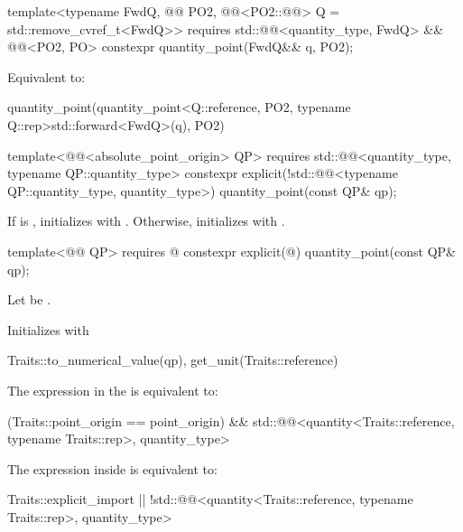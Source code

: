 \begin{itemdecl}
template<typename FwdQ, @@ PO2,
         @@<PO2::@@> Q = std::remove_cvref_t<FwdQ>>
  requires std::@@<quantity_type, FwdQ> && @@<PO2, PO>
constexpr quantity_point(FwdQ&& q, PO2);
\end{itemdecl}

\begin{itemdescr}
\pnum
\effects
Equivalent to:
\begin{codeblock}
quantity_point(quantity_point<Q::reference, PO2{}, typename Q::rep>{std::forward<FwdQ>(q),
                                                                    PO2{}})
\end{codeblock}
\end{itemdescr}

\begin{itemdecl}
template<@@<absolute_point_origin> QP>
  requires std::@@<quantity_type, typename QP::quantity_type>
constexpr explicit(!std::@@<typename QP::quantity_type, quantity_type>)
  quantity_point(const QP& qp);
\end{itemdecl}

\begin{itemdescr}
\pnum
\effects
If  is ,
initializes  with .
Otherwise, initializes  with .
\end{itemdescr}

\begin{itemdecl}
template<@@ QP>
  requires @\seebelownc@
constexpr explicit(@\seebelownc@) quantity_point(const QP& qp);
\end{itemdecl}

\begin{itemdescr}
\pnum
Let  be .

\pnum
\effects
Initializes  with
\begin{codeblock}
Traits::to_numerical_value(qp), get_unit(Traits::reference)
\end{codeblock}

\pnum
\remarks
The expression in the  is equivalent to:
\begin{codeblock}
(Traits::point_origin == point_origin) &&
  std::@@<quantity<Traits::reference, typename Traits::rep>, quantity_type>
\end{codeblock}
The expression inside  is equivalent to:
\begin{codeblock}
Traits::explicit_import ||
  !std::@@<quantity<Traits::reference, typename Traits::rep>, quantity_type>
\end{codeblock}
\end{itemdescr}

